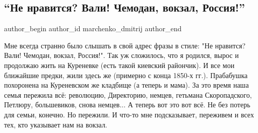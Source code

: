  
 
 
 
 
 
\subsection{\enquote{Не нравится? Вали! Чемодан, вокзал, Россия!}}
\label{sec:24_08_2021.fb.marchenko_dmitrij.1.chemodan_vokzal_rossia}
 
\ifcmt
 author_begin
   author_id marchenko_dmitrij
 author_end
\fi

Мне всегда странно было слышать в свой адрес фразы в стиле: "Не нравится? Вали!
Чемодан, вокзал, Россия!". Так уж сложилось, что я родился, вырос и продолжаю
жить на Куреневке (есть такой киевский райончик). И все мои ближайшие предки,
жили здесь же (примерно с конца 1850-х гг.). Прабабушка похоронена на
Куреневском же кладбище (а теперь и мама). За это время наша семья пережила
всё: революцию, Директорию, немцев, гетьмана Скоропадского, Петлюру,
большевиков, снова немцев... А теперь вот это вот всё. Не без потерь для семьи,
конечно. Но пережили. И что-то мне подсказывает, переживем и всех тех, кто
указывает нам на вокзал.
